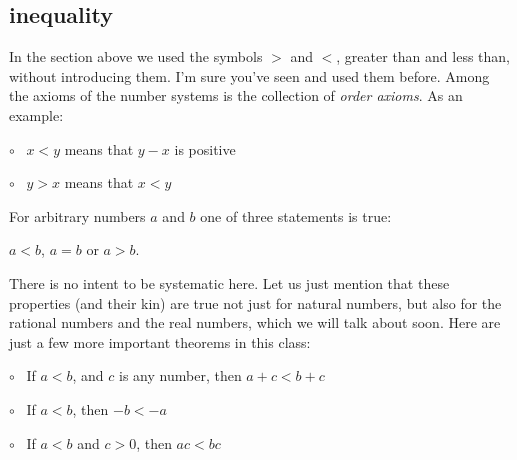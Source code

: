 \documentclass[11pt, oneside]{article}
\begin{document}
\subsection*{inequality}
In the section above we used the symbols $>$ and $<$, greater than and less than, without introducing them.  I'm sure you've seen and used them before.  Among the axioms of the number systems is the collection of \emph{order axioms}.  As an example:

$\circ$ \ $x < y$ means that $y - x$ is positive

$\circ$ \ $y > x$ means that $x < y$

For arbitrary numbers $a$ and $b$ one of three statements is true:  

$a < b$, $a = b$ or $a > b$.

There is no intent to be systematic here.  Let us just mention that these properties (and their kin) are true not just for natural numbers, but also for the rational numbers and the real numbers, which we will talk about soon.  Here are just a few more important theorems in this class:

$\circ$ \ If $a < b$, and $c$ is any number, then $a + c < b + c$

$\circ$ \ If $a < b$, then $-b < -a$

$\circ$ \ If $a < b$ and $c > 0$, then $ac < bc$
\end{document}
